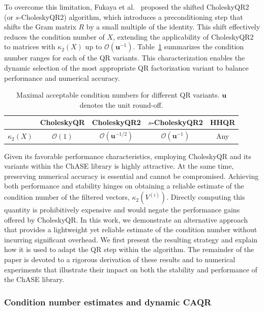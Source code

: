 To overcome this limitation, Fukaya et al.~\cite{fukaya2020shifted} proposed the shifted CholeskyQR2 (or $s$-CholeskyQR2) algorithm, which introduces a preconditioning step that shifts the Gram matrix $R$ by a small multiple of the identity. This shift effectively reduces the condition number of $X$, extending the applicability of CholeskyQR2 to matrices with $\kappa_2(X)$ up to $\mathcal{O}(\mathbf{u}^{-1})$.
Table~\ref{tab:cond_for_qr} summarizes the condition number ranges for each of the QR variants. This characterization enables the dynamic selection of the most appropriate QR factorization variant to balance performance and numerical accuracy.

\begin{table}[htbp]
\footnotesize
\renewcommand{\arraystretch}{1.}
\caption{Maximal acceptable condition numbers for different QR variants. $\mathbf{u}$ denotes the unit round-off.}
\label{tab:cond_for_qr}
\centering
\begin{tabular}{c|c|c|c|c}
\toprule
& CholeskyQR & CholeskyQR2 & $s$-CholeskyQR2 & HHQR \\
\midrule
$\kappa_2(X)$ & $\mathcal{O}(1)$ & $\mathcal{O}(\mathbf{u}^{-1/2})$ & $\mathcal{O}(\mathbf{u}^{-1})$ & Any \\
\bottomrule
\end{tabular}
\end{table}

Given its favorable performance characteristics, employing CholeskyQR and its variants within the ChASE library is highly attractive. At the same time, preserving numerical accuracy is essential and cannot be compromised. Achieving both performance and stability hinges on obtaining a reliable estimate of the condition number of the filtered vectors, $\kappa_2(V^{(i)})$. Directly computing this quantity is prohibitively expensive and would negate the performance gains offered by CholeskyQR. In this work, we demonstrate an alternative approach that provides a lightweight yet reliable estimate of the condition number without incurring significant overhead. We first present the resulting strategy and explain how it is used to adapt the QR step within the algorithm. The remainder of the paper is devoted to a rigorous derivation of these results and to numerical experiments that illustrate their impact on both the stability and performance of the ChASE library.


\subsubsection{Condition number estimates and dynamic CAQR}

